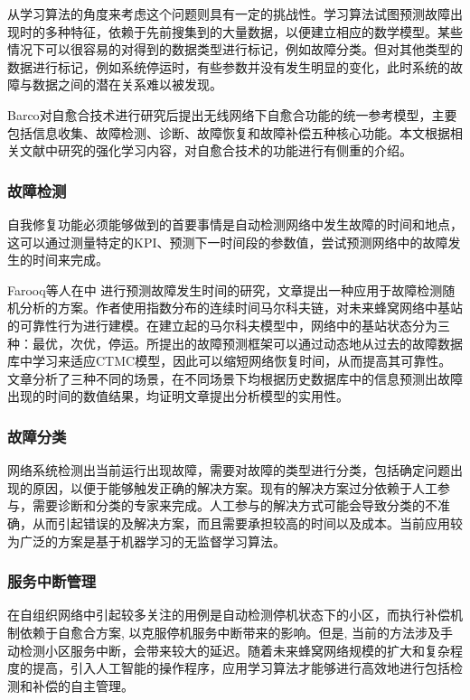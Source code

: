 \documentclass{IEEEtran}
\begin{document}
从学习算法的角度来考虑这个问题则具有一定的挑战性。学习算法试图预测故障出现时的多种特征，依赖于先前搜集到的大量数据，以便建立相应的数学模型。某些情况下可以很容易的对得到的数据类型进行标记，例如故障分类。但对其他类型的数据进行标记，例如系统停运时，有些参数并没有发生明显的变化，此时系统的故障与数据之间的潜在关系难以被发现。

Barco\cite{Barco2012}对自愈合技术进行研究后提出无线网络下自愈合功能的统一参考模型，主要包括信息收集、故障检测、诊断、故障恢复和故障补偿五种核心功能。本文根据相关文献中研究的强化学习内容，对自愈合技术的功能进行有侧重的介绍。

\subsubsection{故障检测}
自我修复功能必须能够做到的首要事情是自动检测网络中发生故障的时间和地点，这可以通过测量特定的KPI、预测下一时间段的参数值，尝试预测网络中的故障发生的时间来完成。

Farooq等人在\cite{Farooq2015}中 进行预测故障发生时间的研究，文章提出一种应用于故障检测随机分析的方案。作者使用指数分布的连续时间马尔科夫链，对未来蜂窝网络中基站的可靠性行为进行建模。在建立起的马尔科夫模型中，网络中的基站状态分为三种：最优，次优，停运。所提出的故障预测框架可以通过动态地从过去的故障数据库中学习来适应CTMC模型，因此可以缩短网络恢复时间，从而提高其可靠性。文章分析了三种不同的场景，在不同场景下均根据历史数据库中的信息预测出故障出现的时间的数值结果，均证明文章提出分析模型的实用性。

\subsubsection{故障分类}

网络系统检测出当前运行出现故障，需要对故障的类型进行分类，包括确定问题出现的原因，以便于能够触发正确的解决方案。现有的解决方案过分依赖于人工参与，需要诊断和分类的专家来完成。人工参与的解决方式可能会导致分类的不准确，从而引起错误的及解决方案，而且需要承担较高的时间以及成本。当前应用较为广泛的方案是基于机器学习的无监督学习算法。


\subsubsection{服务中断管理}

在自组织网络中引起较多关注的用例是自动检测停机状态下的小区，而执行补偿机制依赖于自愈合方案, 以克服停机服务中断带来的影响。但是, 当前的方法涉及手动检测小区服务中断，会带来较大的延迟。随着未来蜂窝网络规模的扩大和复杂程度的提高，引入人工智能的操作程序，应用学习算法才能够进行高效地进行包括检测和补偿的自主管理。
\end{document}
